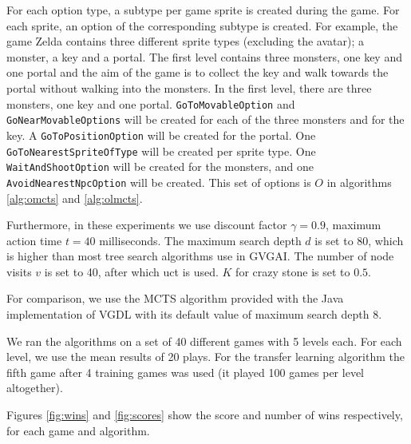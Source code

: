 For each option type, a subtype per game sprite is created during the game. For
each sprite, an option of the corresponding subtype is created. For example, the
game Zelda contains three different sprite types (excluding the avatar); a
monster, a key and a portal. The first level contains three monsters, one key
and one portal and the aim of the game is to collect the key and walk towards
the portal without walking into the monsters. In the first level, there are
three monsters, one key and one portal. \texttt{GoToMovableOption} and
\texttt{GoNearMovableOptions} will be created for each of the three monsters and
for the key. A \texttt{GoToPositionOption} will be created for the portal.
One \texttt{GoToNearestSpriteOfType} will be created per sprite type. One
\texttt{WaitAndShootOption} will be created for the monsters, and one
\texttt{AvoidNearestNpcOption} will be
created. This set of options is $O$ in algorithms \ref{alg:omcts} and
\ref{alg:olmcts}.

Furthermore, in these experiments we use discount factor $\gamma = 0.9$,
maximum action time $t = 40$ milliseconds. The maximum search depth $d$
is set to 80, which is higher than most tree search algorithms use in GVGAI. The
number of node visits $v$ is set to 40, after which \textsf{uct} is used. $K$
for crazy stone is set to $0.5$.

For comparison, we use the MCTS algorithm provided with the Java implementation
of VGDL with its default value of maximum search depth 8. 

We ran the algorithms on a set of 40 different games with 5 levels each. For
each level, we use the mean results of 20 plays. For the transfer learning
algorithm the fifth game after 4 training games was used (it played 100
games per level altogether).


Figures \ref{fig:wins} and \ref{fig:scores} show the score and number of wins
respectively, for each game and algorithm. 
